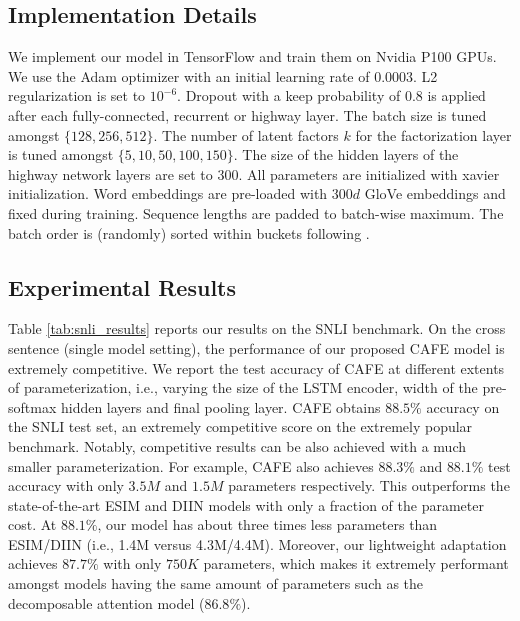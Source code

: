 \documentclass[11pt,a4paper]{article}
\begin{document}
\subsection{Implementation Details}
We implement our model in TensorFlow \cite{tensorflow2015-whitepaper} and train them on Nvidia P100 GPUs. We use the Adam optimizer \cite{DBLP:journals/corr/KingmaB14} with an initial learning rate of $0.0003$. L2 regularization is set to $10^{-6}$. Dropout with a keep probability of $0.8$ is applied after each fully-connected, recurrent or highway layer. The batch size is tuned amongst $\{128, 256, 512\}$. The number of latent factors $k$ for the factorization layer is tuned amongst $\{5,10,50,100,150\}$. The size of the hidden layers of the highway network layers are set to $300$. All parameters are initialized with xavier initialization.  Word embeddings are pre-loaded with $300d$ GloVe embeddings \cite{DBLP:conf/emnlp/PenningtonSM14} and fixed during training. Sequence lengths are padded to batch-wise maximum. The batch order is (randomly) sorted within buckets following \cite{DBLP:conf/emnlp/ParikhT0U16}.


\subsection{Experimental Results}
Table \ref{tab:snli_results} reports our results on the SNLI benchmark. On the cross sentence (single model setting), the performance of our proposed CAFE model is extremely competitive. We report the test accuracy of CAFE at different extents of parameterization, i.e., varying the size of the LSTM encoder, width of the pre-softmax hidden layers and final pooling layer. CAFE obtains $88.5\%$ accuracy on the SNLI test set, an extremely competitive score on the extremely popular benchmark. Notably, competitive results can be also achieved with a much smaller parameterization. For example, CAFE also achieves $88.3\%$ and $88.1\%$ test accuracy with only $3.5M$ and $1.5M$ parameters respectively. This outperforms the state-of-the-art ESIM and DIIN models with only a fraction of the parameter cost. At $88.1\%$, our model has about three times less parameters than ESIM/DIIN (i.e., 1.4M versus 4.3M/4.4M). Moreover, our lightweight adaptation achieves $87.7\%$ with only $750K$ parameters, which makes it extremely performant amongst models having the same amount of parameters such as the decomposable attention model ($86.8\%$).
\end{document}

